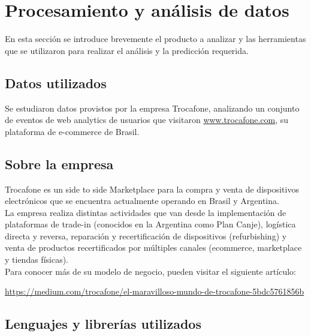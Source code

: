 \documentclass[a4paper ,12pt]{article}
\begin{document}
\tableofcontents %
\newpage

\section{Procesamiento y análisis de datos}\label{sec:intro}

En esta sección se introduce brevemente el producto a analizar y las herramientas que se utilizaron para realizar el análisis y la predicción requerida.



\subsection{Datos utilizados}

Se estudiaron datos provistos por la empresa Trocafone, analizando un conjunto de eventos de web analytics de usuarios que visitaron \url{www.trocafone.com}, su plataforma de e-commerce de Brasil.

\subsection{Sobre la empresa}

 
Trocafone es un side to side Marketplace para la compra y venta de dispositivos electrónicos que se encuentra actualmente operando en Brasil y Argentina. \\


La empresa realiza distintas actividades que van desde la implementación de plataformas de trade-in (conocidos en la Argentina como Plan Canje), logística directa y reversa, reparación y recertificación de dispositivos (refurbishing) y venta de productos recertificados por múltiples canales (ecommerce, marketplace y tiendas físicas).\\ 


Para conocer más de su modelo de negocio, pueden visitar el siguiente artículo:

\url{ https://medium.com/trocafone/el-maravilloso-mundo-de-trocafone-5bdc5761856b}

\subsection{Lenguajes y librerías utilizados}
\end{document}
